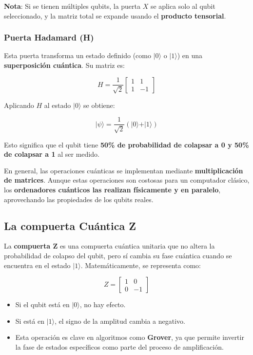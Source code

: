 \documentclass{article}
\begin{document}
\textbf{Nota}: Si se tienen múltiples qubits, la puerta $X$ se aplica solo al qubit seleccionado, y la matriz total se expande usando el \textbf{producto tensorial}.

\subsubsection*{Puerta Hadamard (H)}

Esta puerta transforma un estado definido (como $\vert 0 \rangle$ o $\vert 1 \rangle$) en una \textbf{superposición cuántica}. Su matriz es:

\[
H = \frac{1}{\sqrt{2}} \begin{bmatrix} 1 & 1 \\ 1 & -1 \end{bmatrix}
\]

Aplicando $H$ al estado $\vert 0 \rangle$ se obtiene:

\[
\vert \psi \rangle = \frac{1}{\sqrt{2}}(\vert 0 \rangle + \vert 1 \rangle)
\]

Esto significa que el qubit tiene \textbf{50\% de probabilidad de colapsar a 0 y 50\% de colapsar a 1} al ser medido.

En general, las operaciones cuánticas se implementan mediante \textbf{multiplicación de matrices}. Aunque estas operaciones son costosas para un computador clásico, los \textbf{ordenadores cuánticos las realizan físicamente y en paralelo}, aprovechando las propiedades de los qubits reales.

\subsection*{La compuerta Cuántica Z}

La \textbf{compuerta Z} es una compuerta cuántica unitaria que no altera la probabilidad de 
colapso del qubit, pero sí cambia su fase cuántica cuando se encuentra 
en el estado \(|1\rangle\). Matemáticamente, se representa como:

\[
Z = \begin{bmatrix} 1 & 0 \\ 0 & -1 \end{bmatrix}
\]

\begin{itemize}
    \item Si el qubit está en \(|0\rangle\), no hay efecto.
    \item Si está en \(|1\rangle\), el signo de la amplitud cambia a negativo.
    \item Esta operación es clave en algoritmos como \textbf{Grover}, ya 
            que permite invertir la fase de estados específicos como parte del proceso 
            de amplificación.
\end{itemize}
\end{document}
